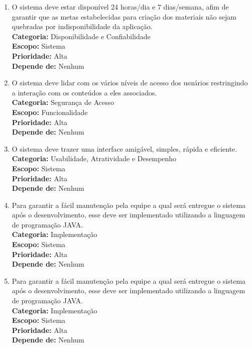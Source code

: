 \begin{enumerate}[label=\textbf{RNF\protect\twodigits{\theenumi}}, leftmargin=2cm]

	\item \label{rf:papeis} O sistema deve estar disponível 24 horas/dia e 7 dias/semana, afim de garantir que as metas estabelecidas para criação dos materiais não sejam quebradas por indisponibilidade da aplicação. \\
		\textbf{Categoria:} Disponibilidade e Confiabilidade \\
		\textbf{Escopo:} Sistema \\
		\textbf{Prioridade:} Alta \\
		\textbf{Depende de:} Nenhum

	\item \label{rf:papeis} O sistema deve lidar com os vários níveis de acesso dos usuários restringindo a interação com os conteúdos a eles associados. \\
		\textbf{Categoria:} Segurança de Acesso \\
		\textbf{Escopo:} Funcionalidade \\
		\textbf{Prioridade:} Alta \\
		\textbf{Depende de:} Nenhum

	\item \label{rf:papeis} O sistema deve trazer uma interface amigável, simples, rápida e eficiente. \\
		\textbf{Categoria:} Usabilidade, Atratividade e Desempenho \\
		\textbf{Escopo:} Sistema \\
		\textbf{Prioridade:} Alta \\
		\textbf{Depende de:} Nenhum

	\item \label{rf:papeis} Para garantir a fácil manutenção pela equipe a qual será entregue o sistema após o desenvolvimento, esse deve ser implementado utilizando a linguagem de programação JAVA. \\
		\textbf{Categoria:} Implementação \\
		\textbf{Escopo:} Sistema \\
		\textbf{Prioridade:} Alta \\
		\textbf{Depende de:} Nenhum

	\item \label{rf:papeis} Para garantir a fácil manutenção pela equipe a qual será entregue o sistema após o desenvolvimento, esse deve ser implementado utilizando a linguagem de programação JAVA. \\
		\textbf{Categoria:} Implementação \\
		\textbf{Escopo:} Sistema \\
		\textbf{Prioridade:} Alta \\
		\textbf{Depende de:} Nenhum

\end{enumerate}


